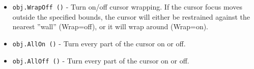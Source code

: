 \begin{itemize}
\item  \verb|obj.WrapOff ()| -  Turn on/off cursor wrapping. If the cursor focus moves outside the
 specified bounds, the cursor will either be restrained against the
 nearest ''wall'' (Wrap=off), or it will wrap around (Wrap=on).

\item  \verb|obj.AllOn ()| -  Turn every part of the cursor on or off.

\item  \verb|obj.AllOff ()| -  Turn every part of the cursor on or off.

\end{itemize}
